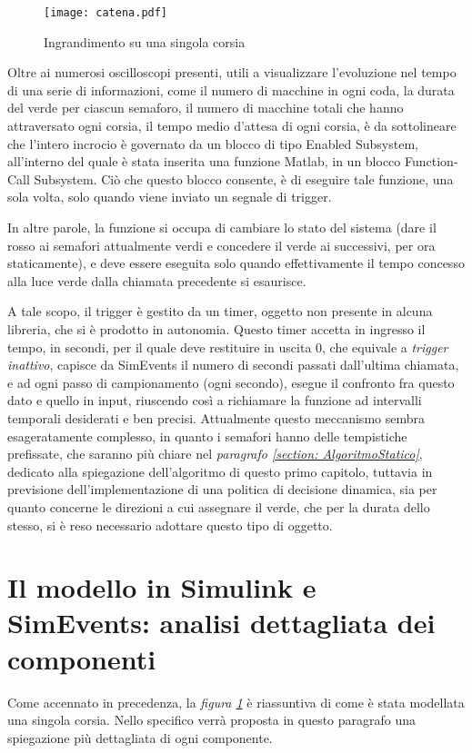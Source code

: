 \begin{figure}[H]
  \texttt{[image: catena.pdf]}
  \caption{Ingrandimento su una singola corsia}
  \label{fig:catenaSingolaCorsia}
\end{figure}
Oltre ai numerosi oscilloscopi presenti, utili a visualizzare l'evoluzione nel tempo di una serie di informazioni, come il numero di macchine in ogni coda, la durata del verde per ciascun semaforo, il numero di macchine totali che hanno attraversato ogni corsia, il tempo medio d’attesa di ogni corsia, è da sottolineare che l’intero incrocio è governato da un blocco di tipo Enabled Subsystem, all’interno del quale è stata inserita una funzione Matlab, in un blocco Function-Call Subsystem. Ciò che questo blocco consente, è di eseguire tale funzione, una sola volta, solo quando viene inviato un segnale di trigger.

In altre parole, la funzione si occupa di cambiare lo stato del sistema (dare il rosso ai semafori attualmente verdi e concedere il verde ai successivi, per ora staticamente), e deve essere eseguita solo quando effettivamente il tempo concesso alla luce verde dalla chiamata precedente si esaurisce.

A tale scopo, il trigger è gestito da un timer, oggetto non presente in alcuna libreria, che si è prodotto in autonomia. Questo timer accetta in ingresso il tempo, in secondi, per il quale deve restituire in uscita 0, che equivale a \textit{trigger inattivo}, capisce da SimEvents il numero di secondi passati dall’ultima chiamata, e ad ogni passo di campionamento (ogni secondo), esegue il confronto fra questo dato e quello in input, riuscendo così a richiamare la funzione ad intervalli temporali desiderati e ben precisi.
Attualmente questo meccanismo sembra esageratamente complesso, in quanto i semafori hanno delle tempistiche prefissate, che saranno più chiare nel \textit{paragrafo \ref{section: AlgoritmoStatico}}, dedicato alla spiegazione dell’algoritmo di questo primo capitolo, tuttavia in previsione dell’implementazione di una politica di decisione dinamica, sia per quanto concerne le direzioni a cui assegnare il verde, che per la durata dello stesso, si è reso necessario adottare questo tipo di oggetto.
\newpage
\section{Il modello in Simulink e SimEvents: analisi dettagliata dei componenti}

Come accennato in precedenza, la \textit{figura \ref{fig:catenaSingolaCorsia}} è riassuntiva di come è stata modellata una singola corsia. Nello specifico verrà proposta in questo paragrafo una spiegazione più dettagliata di ogni componente.
\newline

